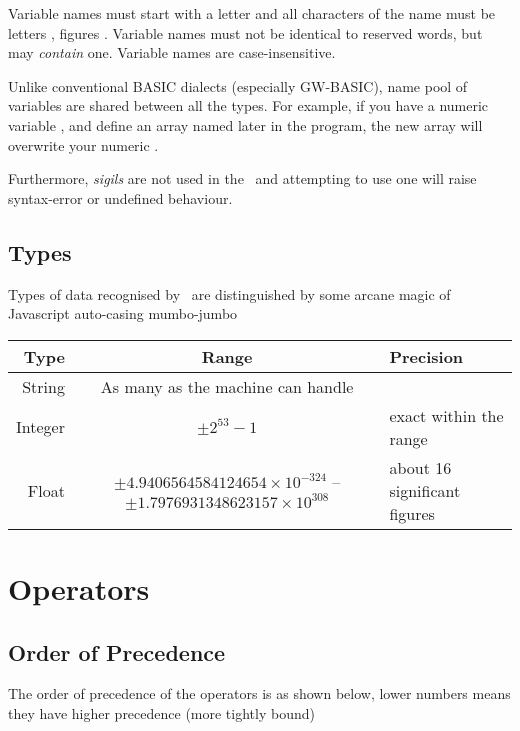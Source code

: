 Variable names must start with a letter and all characters of the name must be letters , figures . Variable names must not be identical to reserved words, but may \emph{contain} one. Variable names are case-insensitive.

Unlike conventional BASIC dialects (especially GW-BASIC), name pool of variables are shared between all the types. For example, if you have a numeric variable , and define an array named  later in the program, the new array will overwrite your numeric .

Furthermore, \emph{sigils} are not used in the \tbas\ and attempting to use one will raise syntax-error or undefined behaviour.

\subsection{Types}

Types of data recognised by \tbas\ are distinguished by some arcane magic of Javascript auto-casing mumbo-jumbo

\begin{tabulary}{\textwidth}{rCL}
Type & Range & Precision \\
\hline
String & As many as the machine can handle & \, \\
Integer & $ \pm 2^{53}-1 $ & exact within the range \\
Float & $ \pm 4.9406564584124654 \times 10^{-324} $ -- $ \pm 1.7976931348623157 \times 10^{308} $ & about 16 significant figures \\
\end{tabulary}

\section{Operators}
\subsection{Order of Precedence}

The order of precedence of the operators is as shown below, lower numbers means they have higher precedence (more tightly bound)

